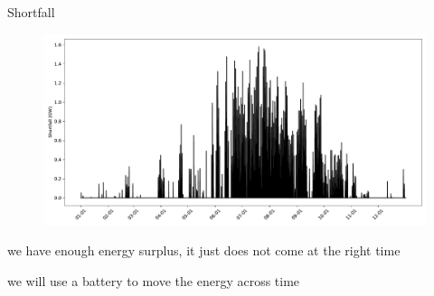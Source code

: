 \documentclass[aspectratio=169,11pt]{beamer}
\begin{document}
\begin{frame}{Shortfall}
	
\begin{figure}
\centering
\includegraphics[width=0.8\columnwidth]{./figures/shortfall.pdf}
\end{figure}

\BIT
\item we have enough energy surplus, it just does not come at the right time
\item we will use a battery to move the energy across time
\EIT
\end{frame}
\end{document}

